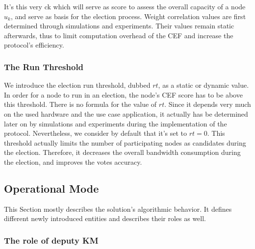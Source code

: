 It’s this very ck which will serve as score to assess the overall capacity of a node $u_k$, and serve as basis for the election process. Weight correlation values are first determined through simulations and experiments. Their values remain static afterwards, thus to limit computation overhead of the CEF and increase the protocol’s efficiency.

\subsubsection{The Run Threshold}

We introduce the election run threshold, dubbed $rt$, as a static or dynamic value. In order for a node to run in an election, the node’s CEF score has to be above this threshold. There is no formula for the value of $rt$. Since it depends very much on the used hardware and the use case application, it actually has be determined later on by simulations and experiments during the implementation of the protocol. Nevertheless, we consider by default that it’s set to $rt=0$. This threshold actually limits the number of participating nodes as candidates during the election. Therefore, it decreases the overall bandwidth consumption during the election, and improves the votes accuracy.

\subsection{Operational Mode}

This Section mostly describes the solution's algorithmic behavior. It defines different newly introduced entities and describes their roles as well.

\subsubsection{The role of deputy KM}

